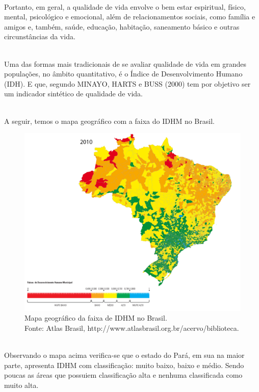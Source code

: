 \documentclass[a4paper, 10pt]{article}
\begin{document}
    \\
    Portanto, em geral, a qualidade de vida envolve o bem estar espiritual, físico, mental, psicológico e emocional, além de relacionamentos sociais, como família e amigos e, também, saúde,  educação, habitação, saneamento básico e outras circunstâncias da vida.
    
    \\
    Uma das formas mais tradicionais de se avaliar qualidade de vida em grandes populações, no âmbito quantitativo, é o Índice de Desenvolvimento Humano (IDH). E que, segundo MINAYO, HARTS e BUSS (2000) tem por objetivo ser um indicador sintético de qualidade de vida.
    
    \\
    A seguir, temos o mapa geográfico com a faixa do IDHM no Brasil.
      
    \begin{figure}[H]
	\centering 
	\includegraphics[scale=0.5]{figs/MAPA BRASIL IDHM 2010.png}
	\caption{\centering Mapa geográfico da faixa de IDHM no Brasil. \\ Fonte: Atlas Brasil, http://www.atlasbrasil.org.br/acervo/biblioteca.}
	\label{Fonte: Atlas Brasil, http://www.atlasbrasil.org.br/acervo/biblioteca}
	\end{figure}
\\
Observando o mapa acima verifica-se que o estado do Pará, em sua na maior parte, apresenta IDHM com classificação: muito baixo, baixo e médio. Sendo poucas as áreas que possuiem classificação alta e nenhuma classificada como muito alta.
\end{document}

